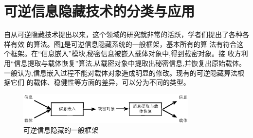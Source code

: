 \section{可逆信息隐藏技术的分类与应用}
\label{s:type_application_reversible_data_hiding}
自从可逆隐藏技术提出以来，这个领域的研究就非常的活跃，学者们提出了各种各样有效
的算法。图\ref{fig:revers_framework}是可逆信息隐藏系统的一般框架，基本所有的算
法有符合这个框架。在``信息嵌入''模块,秘密信息被嵌入载体对象中,得到载密对象。接
收方利用``信息提取与载体恢复''算法,从载密对象中提取出秘密信息,并恢复出原始载体。
一般认为,信息嵌入过程不能对载体对象造成明显的修改。现有的可逆隐藏算法根据它们
的载体、稳健性等方面的差异，可以分为不同的类型。\\
\begin{figure}[!ht]
\centering 
\includegraphics[width=0.8\textwidth]{figures/reversible_framework.eps}
\caption{可逆信息隐藏的一般框架}
\label{fig:revers_framework}
\end{figure}

